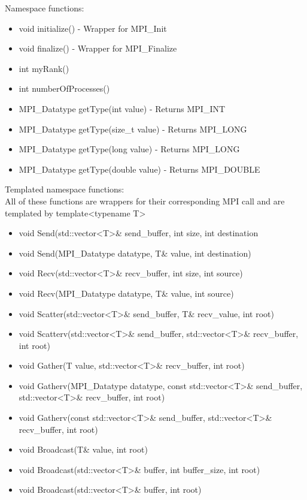 \documentclass[manuscript, screen]{acmart}
\begin{document}
Namespace functions:
\begin{itemize}
\item void initialize() - Wrapper for MPI\_Init
\item void finalize() - Wrapper for MPI\_Finalize
\item int myRank()
\item int numberOfProcesses()
\item MPI\_Datatype getType(int value) - Returns MPI\_INT
\item MPI\_Datatype getType(size\_t value) - Returns MPI\_LONG
\item MPI\_Datatype getType(long value) - Returns MPI\_LONG
\item MPI\_Datatype getType(double value) - Returns MPI\_DOUBLE
\end{itemize}

Templated namespace functions:\\
All of these functions are wrappers for their corresponding MPI call and are templated by template<typename T>
\begin{itemize}
\item void Send(std::vector<T>\& send\_buffer, int size, int destination

\item void Send(MPI\_Datatype datatype, T\& value, int destination)

\item void Recv(std::vector<T>\& recv\_buffer, int size, int source)

\item void Recv(MPI\_Datatype datatype, T\& value, int source)

\item void Scatter(std::vector<T>\& send\_buffer, T\& recv\_value, int root)

\item void Scatterv(std::vector<T>\& send\_buffer, std::vector<T>\& recv\_buffer, int root)

\item void Gather(T value, std::vector<T>\& recv\_buffer, int root)

\item void Gatherv(MPI\_Datatype datatype, const std::vector<T>\& send\_buffer, std::vector<T>\& recv\_buffer, int root)

\item void Gatherv(const std::vector<T>\& send\_buffer, std::vector<T>\& recv\_buffer, int root)

\item void Broadcast(T\& value, int root)

\item void Broadcast(std::vector<T>\& buffer, int buffer\_size, int root)

\item void Broadcast(std::vector<T>\& buffer, int root)
\end{itemize}
\end{document}
